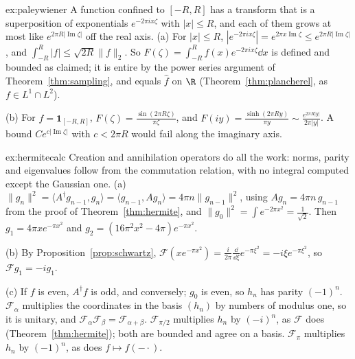 \begin{solution}{ex:paleywiener}
\idea A function confined to $[-R,R]$ has a transform that is a superposition of exponentials $e^{-2\pi ix\zeta}$ with $|x|\le R$, and each of them grows at most like $e^{2\pi R|\operatorname{Im}\zeta|}$ off the real axis.
\writeup (a) For $|x|\le R$, $|e^{-2\pi ix\zeta}|=e^{2\pi x\operatorname{Im}\zeta}\le e^{2\pi R|\operatorname{Im}\zeta|}$, and $\int_{-R}^R|f|\le\sqrt{2R}\|f\|_2$. So $F(\zeta)=\int_{-R}^Rf(x)e^{-2\pi ix\zeta}\dd x$ is defined and bounded as claimed;
it is entire by the power series argument of Theorem~\ref{thm:sampling}, and equals $\hat f$ on $\R$ (Theorem~\ref{thm:plancherel}, as $f\in L^1\cap L^2$).

(b) For $f=\mathbf 1_{[-R,R]}$, $F(\zeta)=\frac{\sin(2\pi R\zeta)}{\pi\zeta}$, and $F(iy)=\frac{\sinh(2\pi Ry)}{\pi y}\sim\frac{e^{2\pi R|y|}}{2\pi|y|}$. A bound $Ce^{c|\operatorname{Im}\zeta|}$ with $c<2\pi R$ would fail along the imaginary axis.
\end{solution}

\begin{solution}{ex:hermitecalc}
\idea Creation and annihilation operators do all the work: norms, parity and eigenvalues follow from the commutation relation, with no integral computed except the Gaussian one.
\writeup (a) $\|g_n\|^2=\langle A^\dagger g_{n-1},g_n\rangle=\langle g_{n-1},Ag_n\rangle=4\pi n\|g_{n-1}\|^2$, using $Ag_n=4\pi n\,g_{n-1}$ from the proof of Theorem~\ref{thm:hermite}, and $\|g_0\|^2=\int e^{-2\pi x^2}=\frac1{\sqrt2}$.
Then $g_1=4\pi xe^{-\pi x^2}$ and $g_2=(16\pi^2x^2-4\pi)e^{-\pi x^2}$.

(b) By Proposition~\ref{prop:schwartz}, $\mathcal F(xe^{-\pi x^2})=\frac i{2\pi}\frac{\dd}{\dd\xi}e^{-\pi\xi^2}=-i\xi e^{-\pi\xi^2}$, so $\mathcal Fg_1=-ig_1$.

(c) If $f$ is even, $A^\dagger f$ is odd, and conversely; $g_0$ is even, so $h_n$ has parity $(-1)^n$. $\mathcal F_\alpha$ multiplies the coordinates in the basis $(h_n)$ by numbers of modulus one, so it is unitary, and
$\mathcal F_\alpha\mathcal F_\beta=\mathcal F_{\alpha+\beta}$. $\mathcal F_{\pi/2}$ multiplies $h_n$ by $(-i)^n$, as $\mathcal F$ does (Theorem~\ref{thm:hermite}); both are bounded and agree on a basis. $\mathcal F_\pi$ multiplies $h_n$ by $(-1)^n$,
as does $f\mapsto f(-\cdot)$.
\end{solution}


